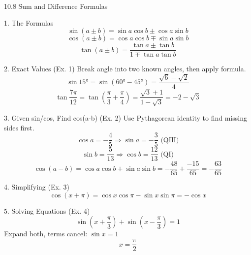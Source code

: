 10.8 Sum and Difference Formulas

1. The Formulas
$$ \sin(a \pm b) = \sin a \cos b \pm \cos a \sin b $$
$$ \cos(a \pm b) = \cos a \cos b \mp \sin a \sin b $$
$$ \tan(a \pm b) = \frac{\tan a \pm \tan b}{1 \mp \tan a \tan b} $$

2. Exact Values (Ex. 1)
Break angle into two known angles, then apply formula.
$$ \sin 15° = \sin(60°-45°) = \frac{\sqrt{6}-\sqrt{2}}{4} $$
$$ \tan\frac{7\pi}{12} = \tan\!\left(\frac{\pi}{3}+\frac{\pi}{4}\right) = \frac{\sqrt{3}+1}{1-\sqrt{3}} = -2-\sqrt{3} $$

3. Given sin/cos, Find cos(a-b) (Ex. 2)
Use Pythagorean identity to find missing sides first.
$$ \cos a = -\frac{4}{5} \Rightarrow \sin a = -\frac{3}{5} \text{ (QIII)} $$
$$ \sin b = \frac{5}{13} \Rightarrow \cos b = \frac{12}{13} \text{ (QI)} $$
$$ \cos(a-b) = \cos a\cos b + \sin a\sin b = -\frac{48}{65}+\frac{-15}{65} = -\frac{63}{65} $$

4. Simplifying (Ex. 3)
$$ \cos(x+\pi) = \cos x\cos\pi - \sin x\sin\pi = -\cos x $$

5. Solving Equations (Ex. 4)
$$ \sin\!\left(x+\frac{\pi}{3}\right)+\sin\!\left(x-\frac{\pi}{3}\right) = 1 $$
Expand both, terms cancel: $\sin x = 1$
$$ x = \frac{\pi}{2} $$
